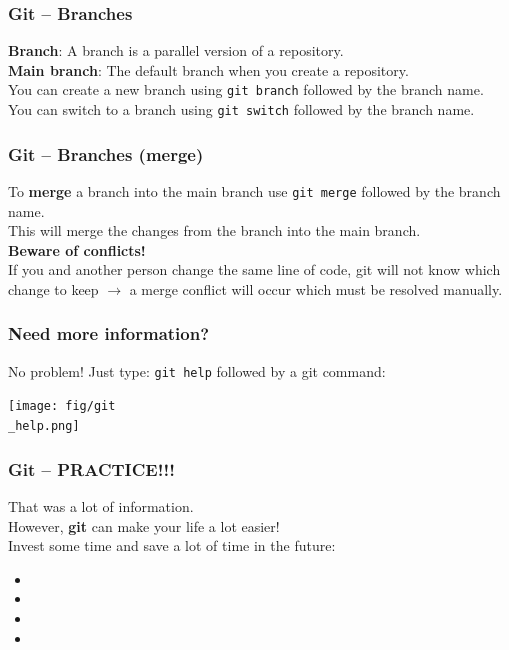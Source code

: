 \documentclass{beamer}
\begin{document}
\begin{frame}
  \frametitle{Git -- Branches}
  \textbf{Branch}: A branch is a parallel version of a repository.\\
  \vspace{5mm}
  \textbf{Main branch}: The default branch when you create a repository.\\
  \vspace{5mm}
  You can create a new branch using \texttt{git branch} followed by the branch name.\\
  \vspace{5mm}
  You can switch to a branch using \texttt{git switch} followed by the branch name.\\
\end{frame}
\begin{frame}
  \frametitle{Git -- Branches (merge)}
  To \textbf{merge} a branch into the main branch use \texttt{git merge} followed by the branch name.\\
  This will merge the changes from the branch into the main branch.\\
  \vspace{5mm}
  \textbf{Beware of conflicts!}\\
  \vspace{5mm}
  If you and another person change the same line of code, git will not know which change to keep $\rightarrow$ a merge conflict will occur which must be resolved manually.\\
\end{frame}
\begin{frame}
  \frametitle{Need more information?}
  No problem! Just type: \texttt{git help} followed by a git command: 
  \begin{center}
    \texttt{[image: fig/git\\\_help.png]}
   \end{center}
\end{frame}
\begin{frame}
  \frametitle{Git -- PRACTICE!!!}
  That was a lot of information.\\
  However, \textbf{git} can make your life a lot easier!\\
  \vspace{5mm}
  Invest some time and save a lot of time in the future: 
  \begin{itemize}
    \item {}
    \item {}
    \item {}
    \item {}
  \end{itemize}

  

\end{frame}
%
\end{document}
